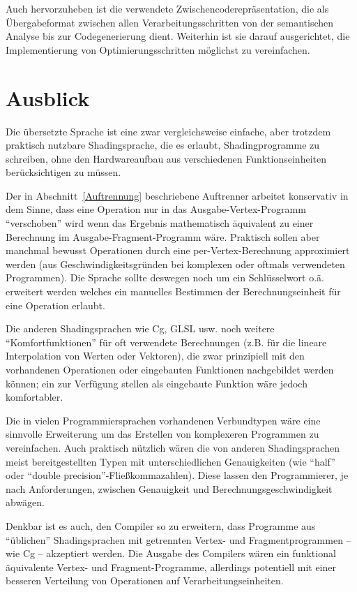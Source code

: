 \documentclass[twoside,a4paper,fleqn,12pt]{book}
\begin{document}
Auch hervorzuheben ist die verwendete Zwischencoderepräsentation, die als Übergabeformat zwischen allen Verarbeitungsschritten von der
semantischen Analyse bis zur Codegenerierung dient. Weiterhin ist sie darauf ausgerichtet, die Implementierung von Optimierungsschritten
möglichst zu vereinfachen.

\chapter{Ausblick}


Die übersetzte Sprache ist eine zwar vergleichsweise einfache, aber trotzdem praktisch nutzbare
Shadingsprache, die es erlaubt, Shadingprogramme zu schreiben, ohne den Hardwareaufbau aus verschiedenen Funktionseinheiten
berücksichtigen zu müssen.

Der in Abschnitt~\ref{Auftrennung} beschriebene Auftrenner arbeitet konservativ in dem Sinne, dass eine Operation nur in das Ausgabe-Vertex-Programm
"`verschoben"' wird wenn das Ergebnis mathematisch äquivalent zu einer Berechnung im Ausgabe-Fragment-Programm wäre.
Praktisch sollen aber manchmal bewusst Operationen durch eine per-Vertex-Berechnung approximiert werden (aus Geschwindigkeitsgründen
bei komplexen oder oftmals verwendeten Programmen). Die Sprache sollte deswegen noch um ein Schlüsselwort o.ä. erweitert werden
welches ein manuelles Bestimmen der Berechnungseinheit für eine Operation erlaubt.

Die anderen Shadingsprachen wie Cg, GLSL usw. noch weitere "`Komfortfunktionen"' für oft verwendete
Berechnungen (z.B. für die lineare Interpolation von Werten oder Vektoren), die zwar prinzipiell mit den vorhandenen Operationen
oder eingebauten Funktionen nachgebildet werden können; ein zur Verfügung stellen als eingebaute Funktion wäre jedoch komfortabler.

Die in vielen Programmiersprachen vorhandenen Verbundtypen wäre eine sinnvolle Erweiterung 
um das Erstellen von komplexeren Programmen zu vereinfachen. Auch praktisch nützlich wären die von anderen Shadingsprachen meist bereitgestellten
Typen mit unterschiedlichen Genauigkeiten (wie ``half'' oder ``double precision''-Fließkommazahlen). Diese lassen den Programmierer, je nach Anforderungen,
zwischen Genauigkeit und Berechnungsgeschwindigkeit abwägen. 

Denkbar ist es auch, den Compiler so zu erweitern, dass Programme aus "`üblichen"' Shadingsprachen mit getrennten Vertex- und Fragmentprogrammen
-- wie Cg -- akzeptiert werden. Die Ausgabe des Compilers wären ein funktional äquivalente Vertex- und Fragment-Programme,
allerdings potentiell mit einer besseren Verteilung von Operationen auf Verarbeitungseinheiten.
\end{document}
